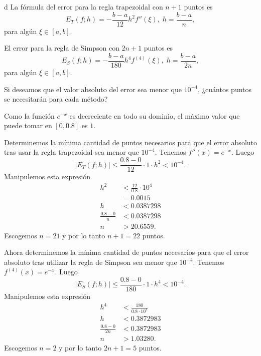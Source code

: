 \begin{statement}{d}
  La f\'ormula del error para la regla trapezoidal con $n + 1$ puntos es
  \[
    E_T(f; h) = -\frac{b - a}{12} h^2 f''(\xi),\; h = \frac{b - a}{n},
  \]
  para alg\'un $\xi \in [a, b]$.

  El error para la regla de Simpson con $2n + 1$ puntos es
  \[
    E_S(f; h) = -\frac{b - a}{180} h^4 f^{(4)}(\xi),\; h = \frac{b - a}{2n},
  \]
  para alg\'un $\xi \in [a, b]$.

  Si deseamos que el valor absoluto del error sea menor que $10^{-4}$,
  ¿cu\'antos puntos se necesitar\'an para cada m\'etodo?
\end{statement}

\begin{solution}
  Como la funci\'on $e^{-x}$ es decreciente en todo su dominio, el m\'aximo
  valor que puede tomar en $[0, 0.8]$ es $1$.

  Determinemos la m\'inima cantidad de puntos necesarios para que el error absoluto
  tras usar la regla trapezoidal sea menor que $10^{-4}$.
  Tenemos $f''(x) = e^{-x}$. Luego
  \[
    |E_T(f; h)| \leq \frac{0.8 - 0}{12} \cdot 1 \cdot h^2 < 10^{-4}.
  \]
  Manipulemos esta expresi\'on
  \begin{align*}
    h^2 &< \frac{12}{0.8} \cdot 10^4 \\
    &= 0.0015 \\
    h &< 0.0387298 \\
    \frac{0.8 - 0}{n} &< 0.0387298 \\
    n &> 20.6559.
  \end{align*}
  Escogemos $n = 21$ y por lo tanto $n + 1 = 22$ puntos.

  Ahora determinemos la m\'inima cantidad de puntos necesarios para que el error absoluto
  tras utilizar la regla de Simpson sea menor que $10^{-4}$.
  Tenemos $f^{(4)}(x) = e^{-x}$. Luego
  \[
    |E_S(f; h)| \leq \frac{0.8 - 0}{180} \cdot 1 \cdot h^4 < 10^{-4}.
  \]
  Manipulemos esta expresi\'on
  \begin{align*}
    h^4 &< \frac{180}{0.8 \cdot 10^4} \\
    h &< 0.3872983 \\
    \frac{0.8 - 0}{2n} &< 0.3872983 \\
    n &> 1.03280.
  \end{align*}
  Escogemos $n = 2$ y por lo tanto $2n + 1 = 5$ puntos.
\end{solution}

